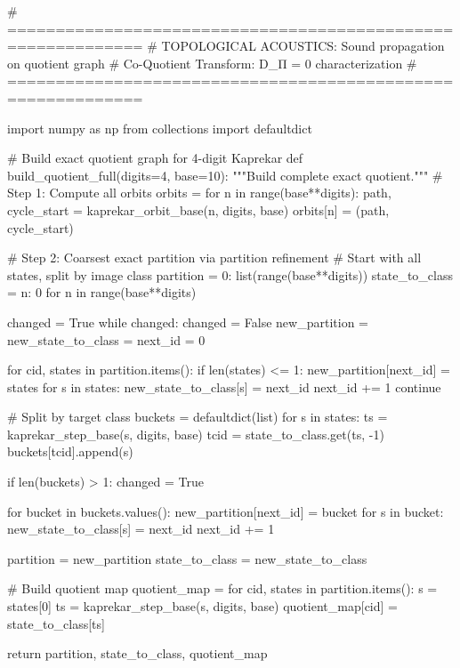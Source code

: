 # ============================================================
# TOPOLOGICAL ACOUSTICS: Sound propagation on quotient graph
# Co-Quotient Transform: D_Π = 0 characterization
# ============================================================

import numpy as np
from collections import defaultdict

# Build exact quotient graph for 4-digit Kaprekar
def build_quotient_full(digits=4, base=10):
    """Build complete exact quotient."""
    # Step 1: Compute all orbits
    orbits = {}
    for n in range(base**digits):
        path, cycle_start = kaprekar_orbit_base(n, digits, base)
        orbits[n] = (path, cycle_start)
    
    # Step 2: Coarsest exact partition via partition refinement
    # Start with all states, split by image class
    partition = {0: list(range(base**digits))}
    state_to_class = {n: 0 for n in range(base**digits)}
    
    changed = True
    while changed:
        changed = False
        new_partition = {}
        new_state_to_class = {}
        next_id = 0
        
        for cid, states in partition.items():
            if len(states) <= 1:
                new_partition[next_id] = states
                for s in states:
                    new_state_to_class[s] = next_id
                next_id += 1
                continue
            
            # Split by target class
            buckets = defaultdict(list)
            for s in states:
                ts = kaprekar_step_base(s, digits, base)
                tcid = state_to_class.get(ts, -1)
                buckets[tcid].append(s)
            
            if len(buckets) > 1:
                changed = True
            
            for bucket in buckets.values():
                new_partition[next_id] = bucket
                for s in bucket:
                    new_state_to_class[s] = next_id
                next_id += 1
        
        partition = new_partition
        state_to_class = new_state_to_class
    
    # Build quotient map
    quotient_map = {}
    for cid, states in partition.items():
        s = states[0]
        ts = kaprekar_step_base(s, digits, base)
        quotient_map[cid] = state_to_class[ts]
    
    return partition, state_to_class, quotient_map

